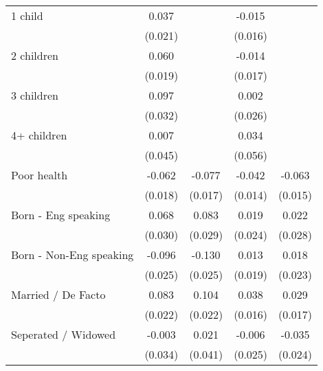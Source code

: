 {\begin{tabular}{l*{4}{c}}
1 child             &       0.037\sym{*}  &                     &      -0.015         &                     \\
                    &     (0.021)         &                     &     (0.016)         &                     \\
2 children          &       0.060\sym{***}&                     &      -0.014         &                     \\
                    &     (0.019)         &                     &     (0.017)         &                     \\
3 children          &       0.097\sym{***}&                     &       0.002         &                     \\
                    &     (0.032)         &                     &     (0.026)         &                     \\
4+ children         &       0.007         &                     &       0.034         &                     \\
                    &     (0.045)         &                     &     (0.056)         &                     \\
Poor health         &      -0.062\sym{***}&      -0.077\sym{***}&      -0.042\sym{***}&      -0.063\sym{***}\\
                    &     (0.018)         &     (0.017)         &     (0.014)         &     (0.015)         \\
Born - Eng speaking &       0.068\sym{**} &       0.083\sym{***}&       0.019         &       0.022         \\
                    &     (0.030)         &     (0.029)         &     (0.024)         &     (0.028)         \\
Born - Non-Eng speaking&      -0.096\sym{***}&      -0.130\sym{***}&       0.013         &       0.018         \\
                    &     (0.025)         &     (0.025)         &     (0.019)         &     (0.023)         \\
Married / De Facto  &       0.083\sym{***}&       0.104\sym{***}&       0.038\sym{**} &       0.029\sym{*}  \\
                    &     (0.022)         &     (0.022)         &     (0.016)         &     (0.017)         \\
Seperated / Widowed &      -0.003         &       0.021         &      -0.006         &      -0.035         \\
                    &     (0.034)         &     (0.041)         &     (0.025)         &     (0.024)         \\

\end{tabular}}
